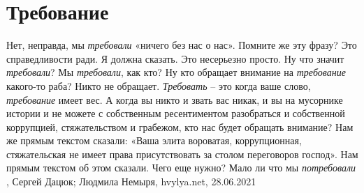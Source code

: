  
 
 
 
 
\chapter{Требование}

Нет, неправда, мы \emph{требовали} «ничего без нас о нас». Помните же эту
фразу? Это справедливости ради. Я должна сказать. Это несерьезно просто. Ну
что значит \emph{требовали}? Мы \emph{требовали}, как кто? Ну кто обращает
внимание на \emph{требование} какого-то раба? Никто не обращает.
\emph{Требовать} – это когда ваше слово, \emph{требование} имеет вес. А когда
вы никто и звать вас никак, и вы на мусорнике истории и не можете с собственным
ресентиментом разобраться и собственной коррупцией, стяжательством и грабежом,
кто нас будет обращать внимание? Нам же прямым текстом сказали: «Ваша элита
вороватая, коррупционная, стяжательская не имеет права присутствовать за столом
переговоров господ». Нам прямым текстом об этом сказали. Чего еще нужно? Мало
ли что мы \emph{потребовали}
, 
Сергей Дацюк; Людмила Немыря, hvylya.net, 28.06.2021

